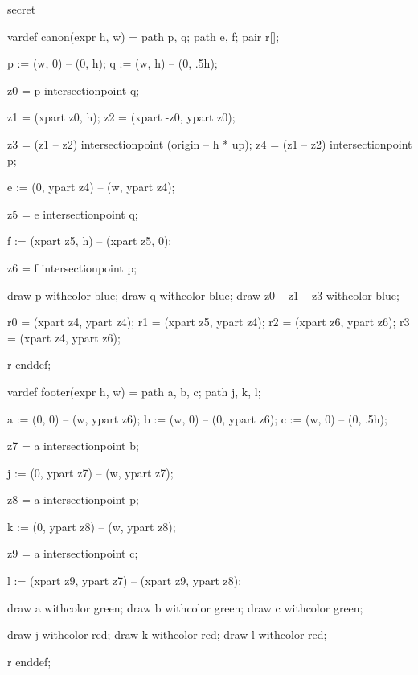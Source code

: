 



\startenvironment secret

	\startMPdefinitions
		vardef canon(expr h, w) =
			path p, q;
			path e, f;
			pair r[];

			p := (w, 0) -- (0,   h);
			q := (w, h) -- (0, .5h);

			z0 = p intersectionpoint q; %

			z1 = (xpart  z0, h); %
			z2 = (xpart -z0, ypart z0); %

			z3 = (z1 -- z2) intersectionpoint (origin -- h * up); %
			z4 = (z1 -- z2) intersectionpoint p; %

			e := (0, ypart z4) -- (w, ypart z4);

			z5 = e intersectionpoint q; %

			f := (xpart z5, h) -- (xpart z5, 0);

			z6 = f intersectionpoint p; %

			draw p withcolor blue;
			draw q withcolor blue;
			draw z0 -- z1 -- z3 withcolor blue;

			r0 = (xpart z4, ypart z4); %
			r1 = (xpart z5, ypart z4); %
			r2 = (xpart z6, ypart z6); %
			r3 = (xpart z4, ypart z6); %

			r
		enddef;

		vardef footer(expr h, w) =
			path a, b, c;
			path j, k, l;

			a := (0, 0) -- (w, ypart z6);
			b := (w, 0) -- (0, ypart z6);
			c := (w, 0) -- (0, .5h);

			z7 = a intersectionpoint b; %

			j := (0, ypart z7) -- (w, ypart z7);

			z8 = a intersectionpoint p; %

			k := (0, ypart z8) -- (w, ypart z8);

			z9 = a intersectionpoint c; %

			l := (xpart z9, ypart z7) -- (xpart z9, ypart z8);

			draw a withcolor green;
			draw b withcolor green;
			draw c withcolor green;

			draw j withcolor red; %
			draw k withcolor red; %
			draw l withcolor red; %


			r
		enddef;
	\stopMPdefinitions

\stopenvironment

